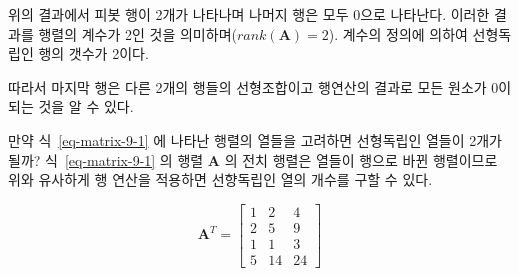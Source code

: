 \documentclass[
  11pt,
  a4paper,
  oneside]{scrbook}
\theoremstyle{definition}
\theoremstyle{definition}
\theoremstyle{plain}
\theoremstyle{remark}
\begin{document}
위의 결과에서 피봇 행이 2개가 나타나며 나머지 행은 모두 0으로 나타난다.
이러한 결과를 행렬의 계수가 2인 것을 의미하며(\(rank(\pmb A)=2\)).
계수의 정의에 의하여 선형독립인 행의 갯수가 2이다.

따라서 마지막 행은 다른 2개의 행들의 선형조합이고 행연산의 결과로 모든
원소가 0이 되는 것을 알 수 있다.

만약 식~\ref{eq-matrix-9-1} 에 나타난 행렬의 열들을 고려하면 선형독립인
열들이 2개가 될까? 식~\ref{eq-matrix-9-1} 의 행렬 \(\pmb A\) 의 전치
행렬은 열들이 행으로 바뀐 행렬이므로 위와 유사하게 행 연산을 적용하면
선향독립인 열의 개수를 구할 수 있다.

\[
\pmb A^T =
\begin{bmatrix}
1 & 2 & 4 \\
2 & 5 & 9 \\
1 & 1 & 3 \\
5 & 14 & 24
\end{bmatrix}
\]
\end{document}
